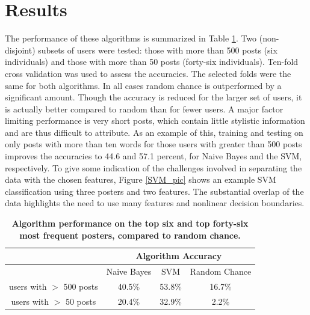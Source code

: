 \documentclass[12pt,letterpaper,onecolumn,oneside]{article}
\numberwithin{equation}{section}
\numberwithin{figure}{section}
\begin{document}
\section{Results}
The performance of these algorithms is summarized in Table \ref{numbers}. Two (non-disjoint) subsets of users were tested: those with more than 500 posts (six individuals) and those with more than 50 posts 
(forty-six individuals). Ten-fold cross validation was used to assess the accuracies. The selected folds were the same for both algorithms. In all cases random chance is outperformed by a significant amount. 
Though the accuracy is reduced for the larger set of users, it is actually better compared to random than for fewer users. A major factor limiting performance is very short posts, which contain little stylistic 
information and are thus difficult to attribute. As an example of this, training and testing on only posts with more than ten words for those users with greater than 500 posts improves the accuracies to 
44.6 and 57.1 percent, for Naive Bayes and the SVM, respectively. To give some indication of the challenges involved in separating the data with the chosen features, Figure \ref{SVM_pic} shows an example SVM 
classification using three posters and two features. The substantial overlap of the data highlights the need to use many features and nonlinear decision boundaries.

\begin{table}
\begin{center}
  \begin{tabular}{| c | c | c | c |}
    \hline
      & \multicolumn{3}{|c|}{Algorithm Accuracy} \\
    \hline
     & Naive Bayes & SVM & Random Chance \\ \hline
    users with \(>\) 500 posts & 40.5\% & 53.8\% & 16.7\% \\ \hline
    users with \(>\) 50 posts & 20.4\% & 32.9\% & 2.2\% \\ \hline
  \end{tabular}
  \caption{\textbf{\footnotesize{Algorithm performance on the top six and top forty-six most frequent posters, compared to random chance.}}}
  \label{numbers}
\end{center}
\end{table}
\end{document}
